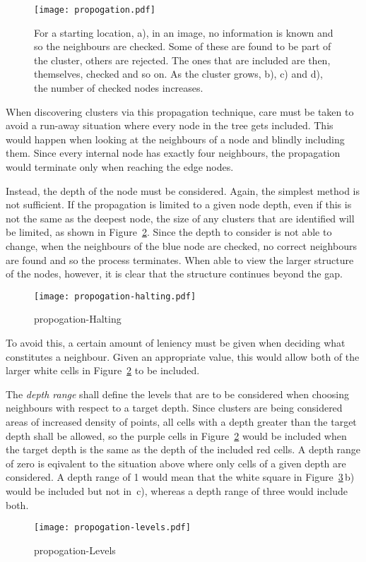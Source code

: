 \begin{figure}[tbhp]
	\centering
	\texttt{[image: propogation.pdf]}
	\caption{For a starting location, a), in an image, no information is known
	and so the neighbours are checked. Some of these are found to be part of
	the cluster, others are rejected. The ones that are included are then,
	themselves, checked and so on. As the cluster grows, b), c) and d), the
	number of checked nodes increases.}
	\label{fig:propogation}
\end{figure}

When discovering clusters via this propagation technique, care must be taken to
avoid a run-away situation where every node in the tree gets included. This
would happen when looking at the neighbours of a node and blindly including
them. Since every internal node has exactly four neighbours, the propagation
would terminate only when reaching the edge nodes.

Instead, the depth of the node must be considered. Again, the simplest method
is not sufficient. If the propagation is limited to a given node depth, even if
this is not the same as the deepest node, the size of any clusters that are
identified will be limited, as shown in Figure~\ref{fig:propogation-halting}.
Since the depth to consider is not able to change, when the neighbours of the
blue node are checked, no correct neighbours are found and so the process
terminates. When able to view the larger structure of the nodes, however, it is
clear that the structure continues beyond the gap.

\begin{figure}[tbhp]
	\centering
	\texttt{[image: propogation-halting.pdf]}
	\caption{propogation-Halting}
	\label{fig:propogation-halting}
\end{figure}

To avoid this, a certain amount of leniency must be given when deciding what
constitutes a neighbour. Given an appropriate value, this would allow both of
the larger white cells in Figure~\ref{fig:propogation-halting} to be included.

The \emph{depth range} shall define the levels that are to be considered when
choosing neighbours with respect to a target depth. Since clusters are being
considered areas of increased density of points, all cells with a depth greater
than the target depth shall be allowed, so the purple cells in
Figure~\ref{fig:propogation-halting} would be included when the target depth is
the same as the depth of the included red cells. A depth range of zero is
eqivalent to the situation above where only cells of a given depth are
considered. A depth range of 1 would mean that the white square in
Figure~\ref{fig:propogation-levels}\,b) would be included but not in~c),
whereas a depth range of three would include both.

\begin{figure}[tbhp]
	\centering
	\texttt{[image: propogation-levels.pdf]}
	\caption{propogation-Levels}
	\label{fig:propogation-levels}
\end{figure}
